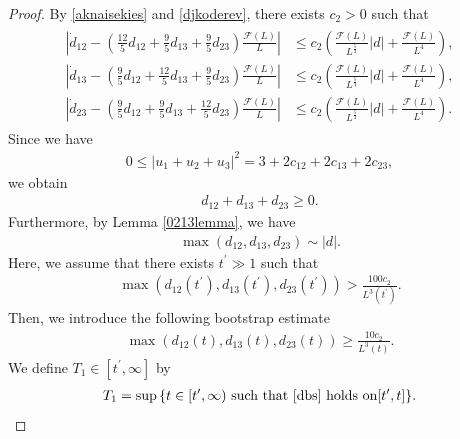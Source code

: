 \documentclass[reqno]{amsart}
\theoremstyle{plain}
\theoremstyle{definition}
\numberwithin{equation}{section}
\newcommand{\1}{\mathbbm{1}}
\begin{document}
\begin{proof}
By \eqref{aknaisekies} and \eqref{djkoderev},  there exists $c_2>0$ such that 
\begin{align}\label{djktotemokitui}
\begin{aligned}
\left|\dot{d}_{12}-\left(\frac{12}{5}d_{12}+\frac{9}{5}d_{13}+\frac{9}{5}d_{23}\right)\frac{\mathcal{F}(L)}{L}\right|&\leq c_2\left(\frac{\mathcal{F}(L)}{L^{\frac{5}{4}}}|d|+\frac{\mathcal{F}(L)}{L^4}\right),
\\
\left|\dot{d}_{13}-\left(\frac{9}{5}d_{12}+\frac{12}{5}d_{13}+\frac{9}{5}d_{23}\right)\frac{\mathcal{F}(L)}{L}\right|&\leq c_2\left(\frac{\mathcal{F}(L)}{L^{\frac{5}{4}}}|d|+\frac{\mathcal{F}(L)}{L^4}\right),
\\
\left|\dot{d}_{23}-\left(\frac{9}{5}d_{12}+\frac{9}{5}d_{13}+\frac{12}{5}d_{23}\right)\frac{\mathcal{F}(L)}{L}\right|&\leq c_2\left(\frac{\mathcal{F}(L)}{L^{\frac{5}{4}}}|d|+\frac{\mathcal{F}(L)}{L^4}\right).
\end{aligned}
\end{align}
Since we have
\begin{align*}
0\leq |u_1+u_2+u_3|^2=3+2c_{12}+2c_{13}+2c_{23},
\end{align*}
we obtain
\begin{align}\label{dwapositive}
d_{12}+d_{13}+d_{23}\geq 0.
\end{align}
Furthermore, by Lemma \ref{0213lemma}, we have
\begin{align}\label{dsim}
\max{(d_{12},d_{13},d_{23})}\sim |d|.
\end{align}
Here, we assume that there exists $t^{\prime}\gg 1$ such that 
\begin{align}\label{djksharpkatei}
\max{(d_{12}(t^{\prime}),d_{13}(t^{\prime}),d_{23}(t^{\prime}))}>\frac{100c_2}{L^3(t^{\prime})}.
\end{align}
Then, we introduce the following bootstrap estimate
\begin{align}\label{dbs}
\max{(d_{12}(t),d_{13}(t),d_{23}(t))}\geq \frac{10c_2}{L^3(t)}.
\end{align}
We define $T_1\in [t^{\prime}, \infty]$ by
\begin{align}\label{T1defdbs}
T_1=\sup{\{t\in[t^{\prime},\infty) \ \mbox{such that \eqref{dbs} holds on} [t^{\prime},t]\}}.

\end{align}
\end{proof}
\end{document}
